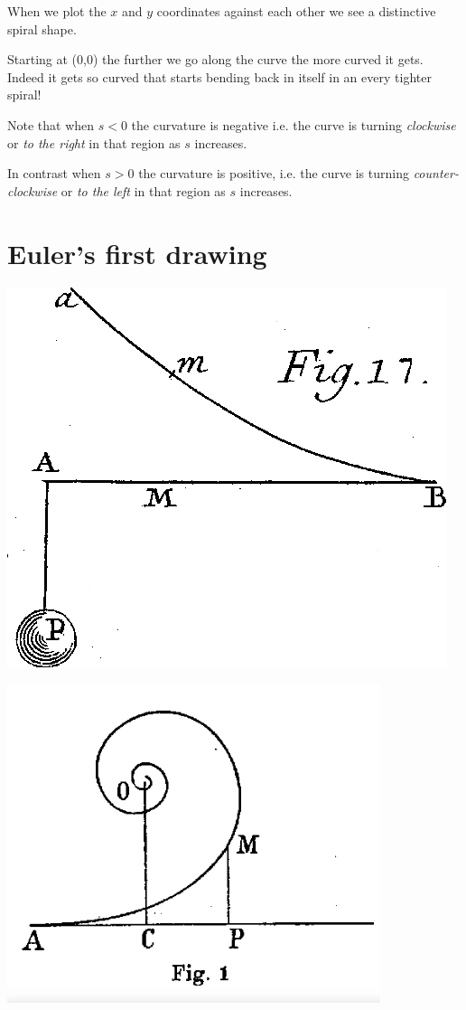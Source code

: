 \documentclass[12pt]{article} %
\theoremstyle{definition}
\theoremstyle{theorem}
\begin{document}
When we plot the $x$ and $y$ coordinates against each other we see a distinctive spiral shape. 

Starting at (0,0) the further we go along the curve the more curved it gets. Indeed it gets so curved that starts bending back in itself in an every tighter spiral!

Note that when $s<0$ the curvature is negative i.e. the curve is turning \emph{clockwise} or \emph{to the right} in that region as $s$ increases. 

In contrast when $s>0$ the curvature is positive, i.e. the curve is turning \emph{counter-clockwise} or \emph{to the left} in that region as $s$ increases.


\section{Euler's first drawing}
\begin{tcolorbox}
	\begin{minipage}{\textwidth}
		\centering
		\includegraphics[width=.5\linewidth]{Euler_first_drawing.png}
		\label{fig:test1}
	\end{minipage}
	\begin{minipage}{\textwidth}
		\centering
		\includegraphics[width=0.5\linewidth]{Euler second drawing.png}
		\label{fig:test2}
	\end{minipage}

\end{tcolorbox}
\end{document}
